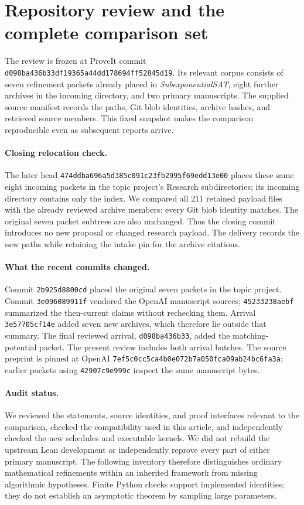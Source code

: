 \section{Repository review and the complete comparison set}
\label{sec:review}

The review is frozen at ProveIt commit
\texttt{d098ba436b33df19365a44dd178694ff52845d19}.
Its relevant corpus consists of seven refinement packets already placed in
\emph{SubexponentialSAT}, eight further archives in the incoming directory,
and two primary manuscripts. The supplied source manifest records the paths,
Git blob identities, archive hashes, and retrieved source members. This fixed
snapshot makes the comparison reproducible even as subsequent reports arrive.

\paragraph{Closing relocation check.}
The later head \texttt{474ddba696a5d385c091c23fb2995f69edd13e00}
places these same eight incoming packets in the topic project's Research
subdirectories; its incoming directory contains only the index. We compared
all 211 retained payload files with the already reviewed archive members:
every Git blob identity matches. The original seven packet subtrees are also
unchanged. Thus the closing commit introduces no new proposal or changed
research payload. The delivery records the new paths while retaining the
intake pin for the archive citations.

\paragraph{What the recent commits changed.}
Commit \texttt{2b925d8800cd} placed the original seven packets in the topic
project. Commit \texttt{3e096089911f} vendored the OpenAI manuscript sources;
\texttt{45233238aebf} summarized the then-current claims without rechecking
them. Arrival \texttt{3e57705cf14e} added seven new archives, which therefore
lie outside that summary. The final reviewed arrival,
\texttt{d098ba436b33}, added the matching-potential packet. The present review
includes both arrival batches. The source preprint is pinned at OpenAI
\texttt{7ef5c0cc5ca4b0e072b7a050fca09ab24bc6fa3a}; earlier packets using
\texttt{42907c9e999c} inspect the same manuscript bytes\cite{upstream,repoindex}.

\paragraph{Audit status.}
We reviewed the statements, source identities, and proof interfaces relevant
to the comparison, checked the compatibility used in this article, and
independently checked the new schedules and executable kernels. We did not
rebuild the upstream Lean development or independently reprove every part
of either primary manuscript. The following inventory therefore distinguishes
ordinary mathematical refinements within an inherited framework from missing
algorithmic hypotheses. Finite Python checks support implemented identities;
they do not establish an asymptotic theorem by sampling large parameters.

